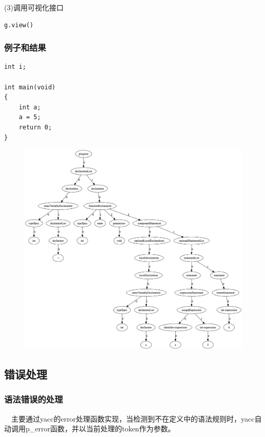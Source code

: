\documentclass{article}
\begin{document}
(3)调用可视化接口


\begin{verbatim}
g.view()
\end{verbatim}

\subsubsection{例子和结果}

\begin{verbatim}
int i;

int main(void)
{
    int a;
    a = 5;
    return 0;
}
\end{verbatim}

\begin{figure}[H]
	\centering
 	\includegraphics[width=\linewidth]{img/tree.png}
\end{figure}
\subsection{错误处理}

\subsubsection{语法错误的处理}

\quad\ \ 主要通过yacc的error处理函数实现，当检测到不在定义中的语法规则时，yacc自动调用p\_error函数，并以当前处理的token作为参数。
\end{document}
